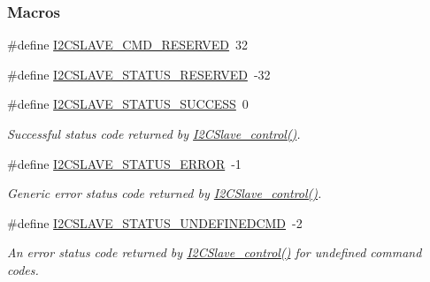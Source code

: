 \subsubsection*{Macros}
\begin{DoxyCompactItemize}
\item 
\#define \hyperlink{_i2_c_slave_8h_a50e2b786948f487d4cb975e5581d93df}{I2\+C\+S\+L\+A\+V\+E\+\_\+\+C\+M\+D\+\_\+\+R\+E\+S\+E\+R\+V\+E\+D}~32
\item 
\#define \hyperlink{_i2_c_slave_8h_a9fe1fa8f941643c68c443fc089fadf3c}{I2\+C\+S\+L\+A\+V\+E\+\_\+\+S\+T\+A\+T\+U\+S\+\_\+\+R\+E\+S\+E\+R\+V\+E\+D}~-\/32
\item 
\#define \hyperlink{_i2_c_slave_8h_a5fefb558e9268fd792ec49f80b697474}{I2\+C\+S\+L\+A\+V\+E\+\_\+\+S\+T\+A\+T\+U\+S\+\_\+\+S\+U\+C\+C\+E\+S\+S}~0
\begin{DoxyCompactList}\small\item\em Successful status code returned by \hyperlink{_i2_c_slave_8h_abcd38688f29738ee33b1748a42a3b140}{I2\+C\+Slave\+\_\+control()}. \end{DoxyCompactList}\item 
\#define \hyperlink{_i2_c_slave_8h_acae8b3350c196cdb215b25d7ca170708}{I2\+C\+S\+L\+A\+V\+E\+\_\+\+S\+T\+A\+T\+U\+S\+\_\+\+E\+R\+R\+O\+R}~-\/1
\begin{DoxyCompactList}\small\item\em Generic error status code returned by \hyperlink{_i2_c_slave_8h_abcd38688f29738ee33b1748a42a3b140}{I2\+C\+Slave\+\_\+control()}. \end{DoxyCompactList}\item 
\#define \hyperlink{_i2_c_slave_8h_a379b9d624bb9cd78f3d4991cc2d15dd2}{I2\+C\+S\+L\+A\+V\+E\+\_\+\+S\+T\+A\+T\+U\+S\+\_\+\+U\+N\+D\+E\+F\+I\+N\+E\+D\+C\+M\+D}~-\/2
\begin{DoxyCompactList}\small\item\em An error status code returned by \hyperlink{_i2_c_slave_8h_abcd38688f29738ee33b1748a42a3b140}{I2\+C\+Slave\+\_\+control()} for undefined command codes. \end{DoxyCompactList}\end{DoxyCompactItemize}
